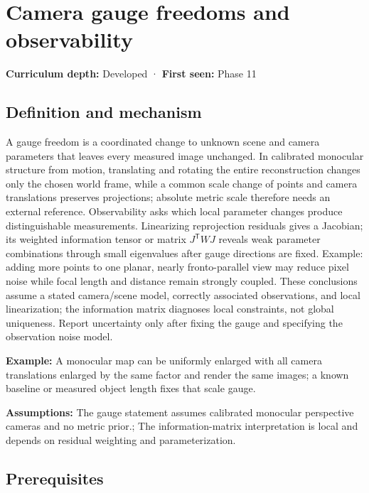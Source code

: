 \hypertarget{appendix-113f0267e5f4}{}
\section{Camera gauge freedoms and observability}\label{appendix-113f0267e5f4-camera-gauge-freedoms-and-observability}

\textbf{Curriculum depth:} Developed · \textbf{First seen:} Phase 11

\subsection{Definition and mechanism}\label{appendix-113f0267e5f4-definition-and-mechanism}

A gauge freedom is a coordinated change to unknown scene and camera parameters that leaves every measured image unchanged. In calibrated monocular structure from motion, translating and rotating the entire reconstruction changes only the chosen world frame, while a common scale change of points and camera translations preserves projections; absolute metric scale therefore needs an external reference. Observability asks which local parameter changes produce distinguishable measurements. Linearizing reprojection residuals gives a Jacobian; its weighted information tensor or matrix \(J^{\mathsf T}WJ\) reveals weak parameter combinations through small eigenvalues after gauge directions are fixed. Example: adding more points to one planar, nearly fronto-parallel view may reduce pixel noise while focal length and distance remain strongly coupled. These conclusions assume a stated camera/scene model, correctly associated observations, and local linearization; the information matrix diagnoses local constraints, not global uniqueness. Report uncertainty only after fixing the gauge and specifying the observation noise model.

\textbf{Example:} A monocular map can be uniformly enlarged with all camera translations enlarged by the same factor and render the same images; a known baseline or measured object length fixes that scale gauge.

\textbf{Assumptions:} The gauge statement assumes calibrated monocular perspective cameras and no metric prior.; The information-matrix interpretation is local and depends on residual weighting and parameterization.

\subsection{Prerequisites}\label{appendix-113f0267e5f4-prerequisites}

